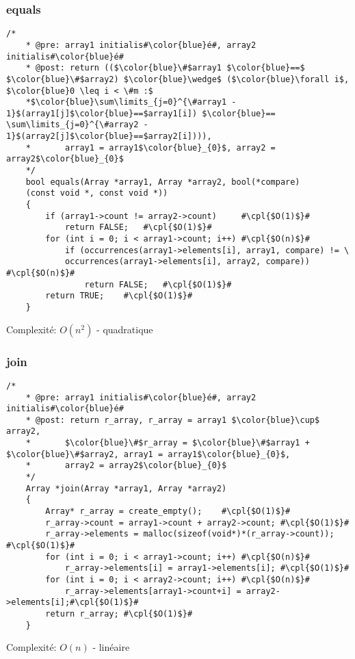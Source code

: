 \documentclass[a4paper, 11pt, oneside]{article}
\begin{document}
	\clearpage
	\subsubsection{equals}
	\begin{lstlisting}[mathescape]
	/*
	* @pre: array1 initialis#\color{blue}é#, array2 initialis#\color{blue}é#
	* @post: return (($\color{blue}\#$array1 $\color{blue}==$ $\color{blue}\#$array2) $\color{blue}\wedge$ ($\color{blue}\forall i$, $\color{blue}0 \leq i < \#m :$
	*$\color{blue}\sum\limits_{j=0}^{\#array1 - 1}$(array1[j]$\color{blue}==$array1[i]) $\color{blue}== \sum\limits_{j=0}^{\#array2 - 1}$(array2[j]$\color{blue}==$array2[i]))),
	*		array1 = array1$\color{blue}_{0}$, array2 = array2$\color{blue}_{0}$
	*/
	bool equals(Array *array1, Array *array2, bool(*compare)    
	(const void *, const void *)) 
	{
		if (array1->count != array2->count)		#\cpl{$O(1)$}#
			return FALSE;	#\cpl{$O(1)$}#
		for (int i = 0; i < array1->count; i++)	#\cpl{$O(n)$}#
			if (occurrences(array1->elements[i], array1, compare) != \
			occurrences(array1->elements[i], array2, compare))	#\cpl{$O(n)$}#
				return FALSE;	#\cpl{$O(1)$}#
		return TRUE;	#\cpl{$O(1)$}#
	}
	\end{lstlisting}
	Complexité: $O(n^2)$ - quadratique
	
	\subsubsection{join}
	\begin{lstlisting}[mathescape]
	/*
	* @pre: array1 initialis#\color{blue}é#, array2 initialis#\color{blue}é#
	* @post: return r_array, r_array = array1 $\color{blue}\cup$ array2, 
	*		$\color{blue}\#$r_array = $\color{blue}\#$array1 + $\color{blue}\#$array2, array1 = array1$\color{blue}_{0}$,
	*		array2 = array2$\color{blue}_{0}$
	*/
	Array *join(Array *array1, Array *array2) 
	{
		Array* r_array = create_empty();	#\cpl{$O(1)$}#
		r_array->count = array1->count + array2->count;	#\cpl{$O(1)$}#
		r_array->elements = malloc(sizeof(void*)*(r_array->count));	#\cpl{$O(1)$}#
		for (int i = 0; i < array1->count; i++)	#\cpl{$O(n)$}#
			r_array->elements[i] = array1->elements[i];	#\cpl{$O(1)$}#
		for (int i = 0; i < array2->count; i++)	#\cpl{$O(n)$}#
			r_array->elements[array1->count+i] = array2->elements[i];#\cpl{$O(1)$}#
		return r_array;	#\cpl{$O(1)$}#
	}
	\end{lstlisting}
	Complexité: $O(n)$ - linéaire
	
	\clearpage
\end{document}
